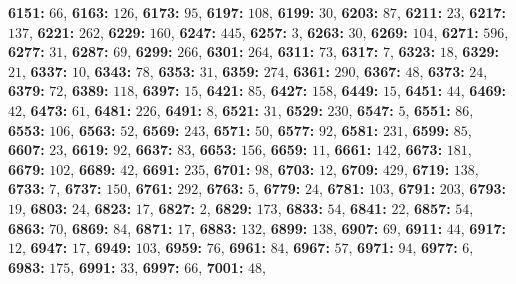 \textsf{\bfseries 6151:} $66$, \textsf{\bfseries 6163:} $126$, \textsf{\bfseries 6173:} $95$, \textsf{\bfseries 6197:} $108$, \textsf{\bfseries 6199:} $30$, \textsf{\bfseries 6203:} $87$, \textsf{\bfseries 6211:} $23$, \textsf{\bfseries 6217:} $137$, \textsf{\bfseries 6221:} $262$, \textsf{\bfseries 6229:} $160$, \textsf{\bfseries 6247:} $445$, \textsf{\bfseries 6257:} $3$, \textsf{\bfseries 6263:} $30$, \textsf{\bfseries 6269:} $104$, \textsf{\bfseries 6271:} $596$, \textsf{\bfseries 6277:} $31$, \textsf{\bfseries 6287:} $69$, \textsf{\bfseries 6299:} $266$, \textsf{\bfseries 6301:} $264$, \textsf{\bfseries 6311:} $73$, \textsf{\bfseries 6317:} $7$, \textsf{\bfseries 6323:} $18$, \textsf{\bfseries 6329:} $21$, \textsf{\bfseries 6337:} $10$, \textsf{\bfseries 6343:} $78$, \textsf{\bfseries 6353:} $31$, \textsf{\bfseries 6359:} $274$, \textsf{\bfseries 6361:} $290$, \textsf{\bfseries 6367:} $48$, \textsf{\bfseries 6373:} $24$, \textsf{\bfseries 6379:} $72$, \textsf{\bfseries 6389:} $118$, \textsf{\bfseries 6397:} $15$, \textsf{\bfseries 6421:} $85$, \textsf{\bfseries 6427:} $158$, \textsf{\bfseries 6449:} $15$, \textsf{\bfseries 6451:} $44$, \textsf{\bfseries 6469:} $42$, \textsf{\bfseries 6473:} $61$, \textsf{\bfseries 6481:} $226$, \textsf{\bfseries 6491:} $8$, \textsf{\bfseries 6521:} $31$, \textsf{\bfseries 6529:} $230$, \textsf{\bfseries 6547:} $5$, \textsf{\bfseries 6551:} $86$, \textsf{\bfseries 6553:} $106$, \textsf{\bfseries 6563:} $52$, \textsf{\bfseries 6569:} $243$, \textsf{\bfseries 6571:} $50$, \textsf{\bfseries 6577:} $92$, \textsf{\bfseries 6581:} $231$, \textsf{\bfseries 6599:} $85$, \textsf{\bfseries 6607:} $23$, \textsf{\bfseries 6619:} $92$, \textsf{\bfseries 6637:} $83$, \textsf{\bfseries 6653:} $156$, \textsf{\bfseries 6659:} $11$, \textsf{\bfseries 6661:} $142$, \textsf{\bfseries 6673:} $181$, \textsf{\bfseries 6679:} $102$, \textsf{\bfseries 6689:} $42$, \textsf{\bfseries 6691:} $235$, \textsf{\bfseries 6701:} $98$, \textsf{\bfseries 6703:} $12$, \textsf{\bfseries 6709:} $429$, \textsf{\bfseries 6719:} $138$, \textsf{\bfseries 6733:} $7$, \textsf{\bfseries 6737:} $150$, \textsf{\bfseries 6761:} $292$, \textsf{\bfseries 6763:} $5$, \textsf{\bfseries 6779:} $24$, \textsf{\bfseries 6781:} $103$, \textsf{\bfseries 6791:} $203$, \textsf{\bfseries 6793:} $19$, \textsf{\bfseries 6803:} $24$, \textsf{\bfseries 6823:} $17$, \textsf{\bfseries 6827:} $2$, \textsf{\bfseries 6829:} $173$, \textsf{\bfseries 6833:} $54$, \textsf{\bfseries 6841:} $22$, \textsf{\bfseries 6857:} $54$, \textsf{\bfseries 6863:} $70$, \textsf{\bfseries 6869:} $84$, \textsf{\bfseries 6871:} $17$, \textsf{\bfseries 6883:} $132$, \textsf{\bfseries 6899:} $138$, \textsf{\bfseries 6907:} $69$, \textsf{\bfseries 6911:} $44$, \textsf{\bfseries 6917:} $12$, \textsf{\bfseries 6947:} $17$, \textsf{\bfseries 6949:} $103$, \textsf{\bfseries 6959:} $76$, \textsf{\bfseries 6961:} $84$, \textsf{\bfseries 6967:} $57$, \textsf{\bfseries 6971:} $94$, \textsf{\bfseries 6977:} $6$, \textsf{\bfseries 6983:} $175$, \textsf{\bfseries 6991:} $33$, \textsf{\bfseries 6997:} $66$, \textsf{\bfseries 7001:} $48$, 

